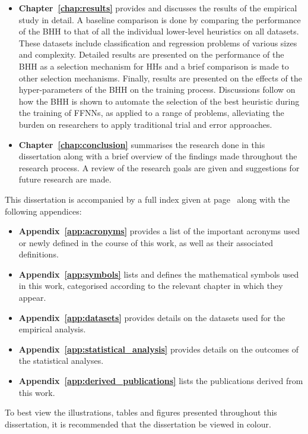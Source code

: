 \begin{itemize}
      \item \textbf{Chapter~\ref{chap:results}} provides and discusses the results of the empirical study in detail. A baseline comparison is done by comparing the performance of the \Acs{BHH} to that of all the individual lower-level heuristics on all datasets. These datasets include classification and regression problems of various sizes and complexity.  Detailed results are presented on the performance of the \Acs{BHH} as a selection mechanism for \acp{HH} and a brief comparison is made to other selection mechanisms. Finally, results are presented on the effects of the hyper-parameters of the \Acs{BHH} on the training process. Discussions follow on how the \Acs{BHH} is shown to automate the selection of the best heuristic during the training of \acp{FFNN}, as applied to a range of problems, alleviating the burden on researchers to apply traditional trial and error approaches.

      \item \textbf{Chapter~\ref{chap:conclusion}} summarises the research done in this dissertation along with a brief overview of the findings made throughout the research process. A review of the research goals are given and suggestions for future research are made.
\end{itemize}

This dissertation is accompanied by a full index given at page~\pageref{index} along with the following appendices:

\begin{itemize}
      \item \textbf{Appendix~\ref{app:acronyms}} provides a list of the important acronyms used or newly defined in the course of this work, as well as their associated definitions.

      \item \textbf{Appendix~\ref{app:symbols}} lists and defines the mathematical symbols used in this work, categorised according to the relevant chapter in which they appear.

      \item \textbf{Appendix~\ref{app:datasets}} provides details on the datasets used for the empirical analysis.

      \item \textbf{Appendix~\ref{app:statistical_analysis}} provides details on the outcomes of the statistical analyses.

      \item \textbf{Appendix~\ref{app:derived_publications}} lists the publications derived from this work.
\end{itemize}

To best view the illustrations, tables and figures presented throughout this dissertation, it is recommended that the dissertation be viewed in colour.
